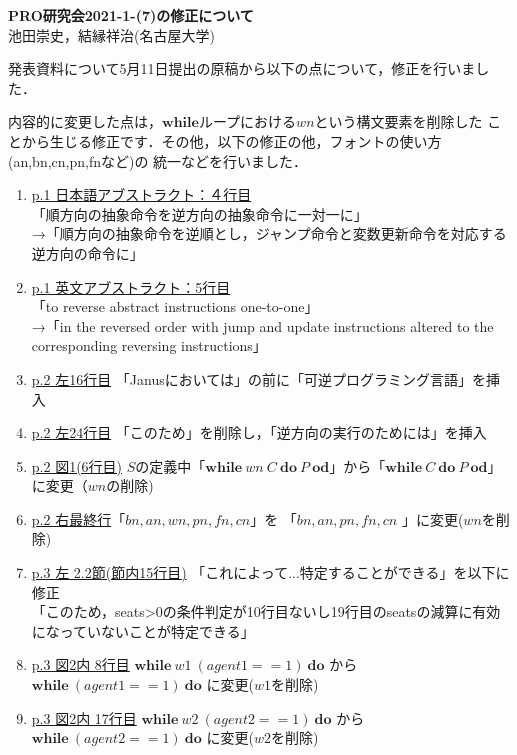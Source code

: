 \documentclass{jarticle}
\begin{document}
\begin{center}
{\bf\Large PRO研究会{2021-1-(7)}の修正について}\\[10pt]
{\large 池田崇史，結縁祥治(名古屋大学)}
\end{center}
発表資料について5月11日提出の原稿から以下の点について，修正を行いました．

内容的に変更した点は，$\mathbf{while}$ループにおける$wn$という構文要素を削除した
ことから生じる修正です．その他，以下の修正の他，フォントの使い方(an,bn,cn,pn,fnなど)の
統一などを行いました．

\begin{enumerate}
\item \underline{p.1 日本語アブストラクト：４行目}\\
「順方向の抽象命令を逆方向の抽象命令に一対一に」\\
→「順方向の抽象命令を逆順とし，ジャンプ命令と変数更新命令を対応する逆方向の命令に」
\item \underline{p.1 英文アブストラクト：5行目}\\
「to reverse abstract instructions one-to-one」\\
→「in the reversed order with jump and update instructions altered to the corresponding reversing instructions」
\item \underline{p.2 左16行目} 「Janusにおいては」の前に「可逆プログラミング言語」を挿入
\item \underline{p.2 左24行目} 「このため」を削除し，「逆方向の実行のためには」を挿入
\item \underline{p.2 図1(6行目)} $S$の定義中「$\mathbf{while}\ wn\ C\ \mathbf{do}\ P\ \mathbf{od}$」から「$\mathbf{while}\ C\ \mathbf{do}\ P\ \mathbf{od}$」に変更（$wn$の削除)
\item \underline{p.2 右最終行}「$bn,an,wn,pn,fn,cn$」を 「$bn,an,pn,fn,cn$ 」に変更($wn$を削除)
\item \underline{p.3 左 2.2節(節内15行目)} 「これによって...特定することができる」を以下に修正\\
「このため，seats>0の条件判定が10行目ないし19行目のseatsの減算に有効になっていないことが特定できる」
\item \underline{p.3 図2内 8行目} $\mathbf{while}\ w1\ (agent1==1)\ \mathbf{do}$ から
         $\mathbf{while}\ (agent1==1)\ \mathbf{do}$ に変更($w1$を削除)\\
\item \underline{p.3 図2内 17行目} $\mathbf{while}\ w2\ (agent2==1)\ \mathbf{do}$ から $\mathbf{while}\ (agent2==1)\ \mathbf{do}$
         に変更($w2$を削除)

\end{enumerate}
\end{document}
